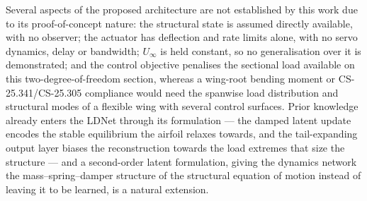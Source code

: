 Several aspects of the proposed architecture are not established by this work due to its
proof-of-concept nature: the structural state is assumed directly available, with no observer;
the actuator has deflection and rate limits alone, with no servo dynamics, delay or bandwidth;
$U_\infty$ is held constant, so no generalisation over it is demonstrated; and the control
objective penalises the sectional load available on this two-degree-of-freedom section, whereas
a wing-root bending moment or CS-25.341/CS-25.305 compliance would need the spanwise load
distribution and structural modes of a flexible wing with several control surfaces. Prior
knowledge already enters the LDNet through its formulation --- the damped latent update encodes
the stable equilibrium the airfoil relaxes towards, and the tail-expanding output layer biases
the reconstruction towards the load extremes that size the structure --- and a second-order
latent formulation, giving the dynamics network the mass--spring--damper structure of the
structural equation of motion instead of leaving it to be learned, is a natural extension.